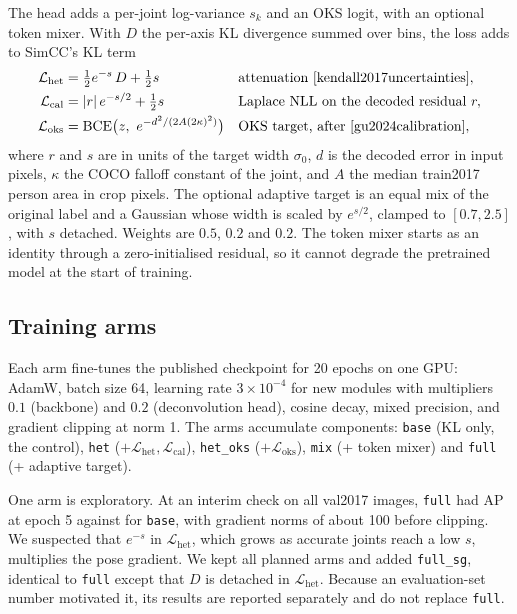 \documentclass[preprint,11pt]{elsarticle}
\begin{document}
The head adds a per-joint log-variance $s_k$ and an OKS logit, with an optional token mixer. With
$D$ the per-axis KL divergence summed over bins, the loss adds to SimCC's KL term
\begin{align}
\mathcal{L}_{\text{het}} &= \tfrac{1}{2} e^{-s}\, D + \tfrac{1}{2} s
  && \text{attenuation~\cite{kendall2017uncertainties}},\\
\mathcal{L}_{\text{cal}} &= |r|\, e^{-s/2} + \tfrac{1}{2} s
  && \text{Laplace NLL on the decoded residual } r,\\
\mathcal{L}_{\text{oks}} &= \mathrm{BCE}\big(z,\ e^{-d^2 / (2A(2\kappa)^2)}\big)
  && \text{OKS target, after~\cite{gu2024calibration}},
\end{align}
where $r$ and $s$ are in units of the target width $\sigma_0$, $d$ is the decoded error in input
pixels, $\kappa$ the COCO falloff constant of the joint, and $A$ the median train2017 person area
in crop pixels. The optional adaptive target is an equal mix of the original label and a Gaussian whose width is
scaled by $e^{s/2}$, clamped to $[0.7, 2.5]$, with $s$ detached. Weights are $0.5$, $0.2$ and $0.2$. The token mixer starts as an
identity through a zero-initialised residual, so it cannot degrade the pretrained model at the
start of training.

\subsection{Training arms}\label{sec:arms}

Each arm fine-tunes the published checkpoint for 20 epochs on one GPU: AdamW, batch size 64,
learning rate $3\times10^{-4}$ for new modules with multipliers $0.1$ (backbone) and $0.2$
(deconvolution head), cosine decay, mixed precision, and gradient clipping at norm 1. The arms
accumulate components: \texttt{base} (KL only, the control), \texttt{het}
($+\mathcal{L}_{\text{het}},\mathcal{L}_{\text{cal}}$), \texttt{het\_oks}
($+\mathcal{L}_{\text{oks}}$), \texttt{mix} (+ token mixer) and \texttt{full} (+ adaptive target).

One arm is exploratory. At an interim check on all val2017 images, \texttt{full} had AP
\interimApFull{} at epoch 5 against \interimApBase{} for \texttt{base}, with gradient norms of
about 100 before clipping. We suspected that $e^{-s}$ in $\mathcal{L}_{\text{het}}$, which grows
as accurate joints reach a low $s$, multiplies the pose gradient. We kept all planned arms and
added \texttt{full\_sg}, identical to \texttt{full} except that $D$ is detached in
$\mathcal{L}_{\text{het}}$. Because an evaluation-set number motivated it, its results are
reported separately and do not replace \texttt{full}.
\end{document}
